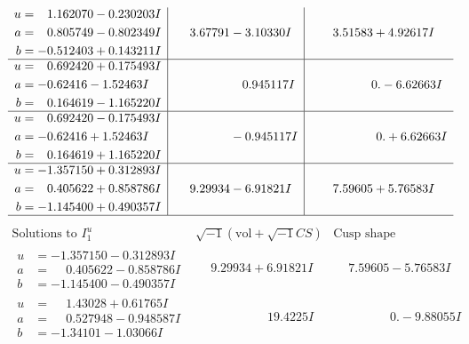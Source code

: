 \documentclass[1p]{elsarticle_modified}
\theoremstyle{definition}
\newcommand{\I}{\sqrt{-1}}
\begin{document}
$$\begin{array}{c|c|c}
\begin{aligned}
u &= \phantom{-}1.162070 - 0.230203 I \\
a &= \phantom{-}0.805749 - 0.802349 I \\
b &= -0.512403 + 0.143211 I\end{aligned}
 & \phantom{-}3.67791 - 3.10330 I & \phantom{-}3.51583 + 4.92617 I \\ \hline\begin{aligned}
u &= \phantom{-}0.692420 + 0.175493 I \\
a &= -0.62416 - 1.52463 I \\
b &= \phantom{-}0.164619 - 1.165220 I\end{aligned}
 & \phantom{-0.000000 -}0.945117 I & \phantom{-0.000000 } 0. - 6.62663 I \\ \hline\begin{aligned}
u &= \phantom{-}0.692420 - 0.175493 I \\
a &= -0.62416 + 1.52463 I \\
b &= \phantom{-}0.164619 + 1.165220 I\end{aligned}
 & \phantom{-0.000000 } -0.945117 I & \phantom{-0.000000 -}0. + 6.62663 I \\ \hline\begin{aligned}
u &= -1.357150 + 0.312893 I \\
a &= \phantom{-}0.405622 + 0.858786 I \\
b &= -1.145400 + 0.490357 I\end{aligned}
 & \phantom{-}9.29934 - 6.91821 I & \phantom{-}7.59605 + 5.76583 I\\
 \hline 
 \end{array}$$\newpage$$\begin{array}{c|c|c}  
\text{Solutions to }I^u_{1}& \I (\text{vol} + \sqrt{-1}CS) & \text{Cusp shape}\\
 \hline 
\begin{aligned}
u &= -1.357150 - 0.312893 I \\
a &= \phantom{-}0.405622 - 0.858786 I \\
b &= -1.145400 - 0.490357 I\end{aligned}
 & \phantom{-}9.29934 + 6.91821 I & \phantom{-}7.59605 - 5.76583 I \\ \hline\begin{aligned}
u &= \phantom{-}1.43028 + 0.61765 I \\
a &= \phantom{-}0.527948 - 0.948587 I \\
b &= -1.34101 - 1.03066 I\end{aligned}
 & \phantom{-0.000000 -}19.4225 I & \phantom{-0.000000 } 0. - 9.88055 I \\ \hline\begin{aligned}

\end{aligned}
\end{array}$$
\end{document}
